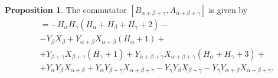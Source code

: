 \documentclass[twoside,a4paper,12pt]{article}
\theoremstyle{definition}
\newtheorem{proposition}{Proposition}
\begin{document}
\begin{proposition}\label{baabc}
	The commutator $[B_{\alpha+\beta+\gamma},A_{\alpha+\beta+\gamma}]$ is given
	by
	\begin{align*}
		[B_{\alpha+\beta+\gamma},A_{\alpha+\beta+\gamma}]&
		=-H_\alpha H_\gamma(H_\alpha+H_\beta+H_\gamma+2)-\\
		&-Y_\beta X_\beta+Y_{\alpha+\beta}X_{\alpha+\beta}(H_\alpha+1)+\\
		&+Y_{\beta+\gamma}X_{\beta+\gamma}(H_\gamma+1)
		+Y_{\alpha+\beta+\gamma}X_{\alpha+\beta+\gamma}(H_\alpha+H_\gamma+3)+\\
		&+Y_\alpha Y_\beta X_{\alpha+\beta}
		+Y_\alpha Y_{\beta+\gamma}X_{\alpha+\beta+\gamma}
		-Y_\gamma Y_\beta X_{\beta+\gamma}
		-Y_\gamma Y_{\alpha+\beta}X_{\alpha+\beta+\gamma}.
	\end{align*}
\end{proposition}
\end{document}
